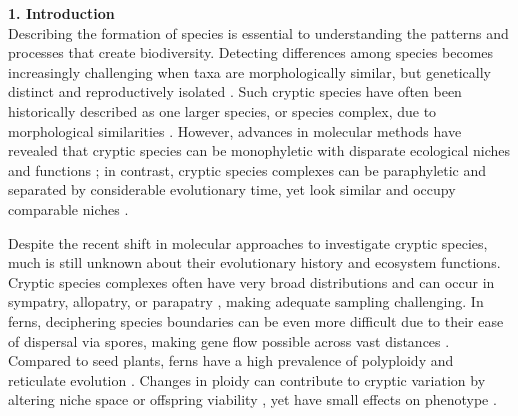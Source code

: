 \documentclass[12pt]{article}
\begin{document}
\begin{flushleft}
{\large\textbf{1. Introduction}}\\

Describing the formation of species is essential to understanding the patterns and processes that create biodiversity. Detecting differences among species becomes increasingly challenging when taxa are morphologically similar, but genetically distinct and reproductively isolated \autocite{Bickford2007, Masuyama1992, Paris1989}. Such cryptic species have often been historically described as one larger species, or species complex, due to morphological similarities \autocite{Paris1989}. However, advances in molecular methods have revealed that cryptic species can be monophyletic with disparate ecological niches and functions \autocite{Amato2007, Hebert2004, Sattler2007, Southgate2019}; in contrast, cryptic species complexes can be paraphyletic and separated by considerable evolutionary time, yet look similar and occupy comparable niches \autocite{Amor2014, Cunnington2005}. 

Despite the recent shift in molecular approaches to investigate cryptic species, much is still unknown about their evolutionary history and ecosystem functions. Cryptic species complexes often have very broad distributions \autocite{Der2009, Knowlton1993, Nygren2014} and can occur in sympatry, allopatry, or parapatry \autocite{Bickford2007}, making adequate sampling challenging. In ferns, deciphering species boundaries can be even more difficult due to their ease of dispersal via spores, making gene flow possible across vast distances \autocite{Barrington1993, Tryon1970}. Compared to seed plants, ferns have a high prevalence of polyploidy and reticulate evolution \autocite{Barrington1989, Paris1989, Sigel2016, Otto2000, Otto2000}. Changes in ploidy can contribute to cryptic variation by altering niche space or offspring viability \autocite{Otto2007, Southgate2019, Masuyama2002}, yet have small effects on phenotype \autocite{Patel2019}.


\end{flushleft}
\end{document}
